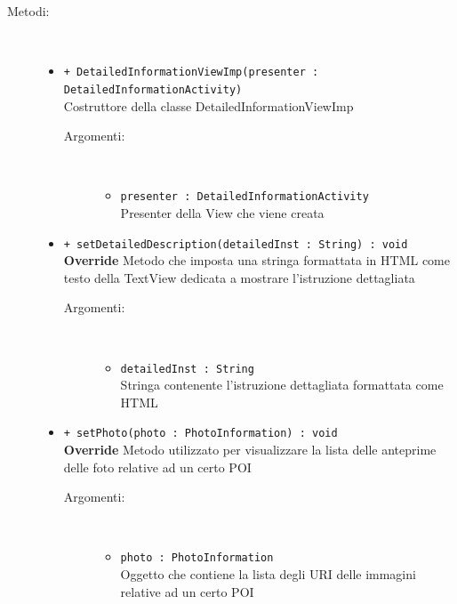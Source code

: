 \documentclass[../DefinizioneDiProdotto.tex]{subfiles}
\begin{document}
\begin{description}
\begin{itemize}
	\end{itemize}
	\item[Metodi:] \
	\begin{itemize}
		\item \texttt{+ DetailedInformationViewImp(presenter : DetailedInformationActivity)}\\
		Costruttore della classe DetailedInformationViewImp
		\begin{description}
			\item[Argomenti:] \
			\begin{itemize}
				\item \texttt{presenter : DetailedInformationActivity}\\
				Presenter della View che viene creata\end{itemize}
		\end{description}
		\item \texttt{+ setDetailedDescription(detailedInst : String) : void}\\
		\textbf{Override} Metodo che imposta una stringa formattata in HTML come testo della TextView dedicata a mostrare l'istruzione dettagliata
		\begin{description}
			\item[Argomenti:] \
			\begin{itemize}
				\item \texttt{detailedInst : String}\\
				Stringa contenente l'istruzione dettagliata formattata come HTML\end{itemize}
		\end{description}
		\item \texttt{+ setPhoto(photo : PhotoInformation) : void}\\
		\textbf{Override} Metodo utilizzato per visualizzare la lista delle anteprime delle foto relative ad un certo POI
		\begin{description}
			\item[Argomenti:] \
			\begin{itemize}
				\item \texttt{photo : PhotoInformation}\\
				Oggetto che contiene la lista degli URI delle immagini relative ad un certo POI\end{itemize}
		\end{description}
	\end{itemize}
\end{description}
\end{document}
